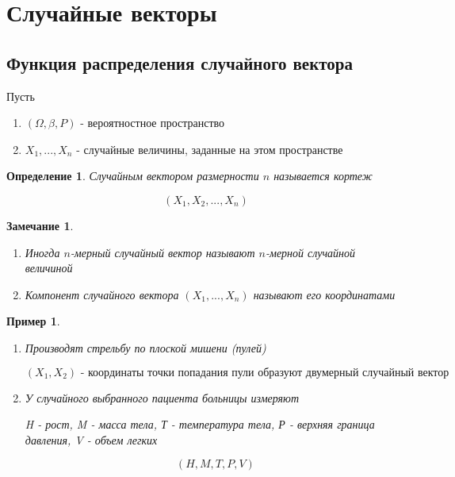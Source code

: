 \documentclass[a4paper, 14pt]{report}
\newtheorem{defenition}{Определение}[section]
\newtheorem{note}{Замечание}[section]
\newtheorem{example}{Пример}[section]
\begin{document}
\section{Случайные векторы}

\subsection{Функция распределения случайного вектора}

Пусть

\begin{enumerate}
    \item $(\Omega, \beta, P)$ - вероятностное пространство
    \item $X_1, ..., X_n$ - случайные величины, заданные на этом пространстве
\end{enumerate}

\begin{defenition}
    Случайным вектором размерности $n$ называется кортеж

    $$
    (X_1, X_2,..., X_n)
    $$
\end{defenition}

\begin{note}
    \begin{enumerate}
        \item Иногда $n$-мерный случайный вектор называют $n$-мерной случайной величиной
        \item Компонент случайного вектора $(X_1,...,X_n)$ называют его координатами
    \end{enumerate}
\end{note}

\begin{example}

    \hfill

    \begin{enumerate}
        \item Производят стрельбу по плоской мишени (пулей)

            $$
            (X_1, X_2) \text{ - координаты точки попадания пули образуют двумерный случайный вектор}
            $$

        \item У случайного выбранного пациента больницы измеряют

            H - рост, M - масса тела, Т - температура тела, Р - верхняя граница давления, V - объем легких

            $$
            (H,M,T,P,V)
            $$
    \end{enumerate}
\end{example}
\end{document}
